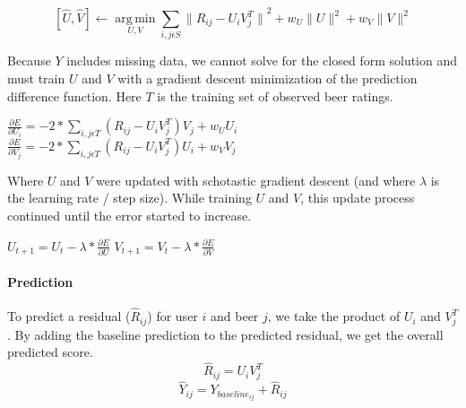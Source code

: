 \documentclass[12pt]{article}
\DeclareMathOperator*{\argmin}{arg\,min}
\begin{document}
$$ [\hat{U}, \hat{V}] \leftarrow \argmin\limits_{U,V}\sum\limits_{i,j \epsilon S} {\|R_{ij} - U_i V_j^T\|}^2 + w_U\|U\|^2 + w_V\|V\|^2$$

Because $Y$ includes missing data, we cannot solve for the closed form solution and must train $U$ and $V$ with a gradient descent minimization of the prediction difference function. Here $T$ is the training set of observed beer ratings. \\

\begin{center}
$ \frac{\partial E}{\partial U_i} = -2 * \sum\limits_{i,j \epsilon T} (R_{ij} - U_i V_j^T) V_j + w_U U_i $ \hspace{1cm} $ \frac{\partial E}{\partial V_j} = -2 * \sum\limits_{i,j \epsilon T} (R_{ij} - U_i V_j^T) U_i + w_V V_j$\\
\end{center}




Where $U$ and $V$ were updated with schotastic gradient descent (and where $\lambda$ is the learning rate / step size). While training $U$ and $V$, this update process continued until the error started to increase.
\begin{center}
$ U_{t+1} = U_t - \lambda * \frac{\partial E}{\partial U}$ \hspace{2cm} $V_{t+1} = V_t - \lambda * \frac{\partial E}{\partial V}$
\end{center}
\paragraph{Prediction} To predict a residual ($\hat R_{ij}$) for user $i$ and beer $j$, we take the product of $U_i$ and $V_j^T$. By adding the baseline prediction to the predicted residual, we get the overall predicted score.
$$ \hat{R}_{ij} = U_i V_j^T $$
$$ \hat{Y}_{ij} = Y_{baseline_{ij}} + \hat{R}_{ij} $$
\end{document}
